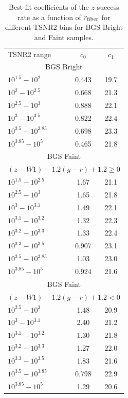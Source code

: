 \begin{table} 
    \caption{Best-fit coefficients of the $z$-success rate as a function of
    $r_{\rm fiber}$ for different TSNR2 bins for BGS Bright and Faint samples.} 
    \begin{center}
        \begin{tabular}{lcc} \toprule
            TSNR2 range & $c_0$ & $c_1$ \\[3pt]
            \multicolumn{3}{c}{BGS Bright} \\
            \hline 
            $10^{1.5}   - 10^{2}$       & 0.443 & 19.7 \\ 
            $10^{2}     - 10^{2.5}$       & 0.668 & 21.3 \\ 
            $10^{2.5}   - 10^{3}$       & 0.888 & 22.1 \\ 
            $10^{3}     - 10^{3.5}$       & 0.822 & 22.4 \\ 
            $10^{3.5}   - 10^{3.85}$    & 0.698 & 23.3 \\ 
            $10^{3.85}  - 10^{5}$      & 0.465 & 21.8 \\ 
            \hline            
            \hline 
            \multicolumn{3}{c}{BGS Faint}\\
            \multicolumn{3}{c}{$(z - W1) - 1.2(g - r) + 1.2 \ge 0$} \\
            \hline 
            $10^{1.5}   - 10^{2.5}$     & 1.67  & 21.1 \\ 
            $10^{2.5}   - 10^{3}$       & 1.65  & 21.8 \\ 
            $10^{3}     - 10^{3.1}$     & 1.49  & 22.1 \\ 
            $10^{3.1}   - 10^{3.2}$     & 1.32  & 22.3 \\ 
            $10^{3.2}   - 10^{3.3}$     & 1.33  & 22.4 \\ 
            $10^{3.3}   - 10^{3.5}$     & 0.907 & 23.1 \\ 
            $10^{3.5}   - 10^{3.85}$    & 1.03  & 23.0 \\ 
            $10^{3.85}  - 10^{5}$       & 0.924 & 21.6 \\ 
            \hline 
            \hline 
            \multicolumn{3}{c}{BGS Faint}\\
            \multicolumn{3}{c}{$(z - W1) - 1.2(g - r) + 1.2 < 0$} \\
            \hline 
            $10^{2.5}   - 10^{3}$       & 1.48  & 20.9 \\ 
            $10^{3}     - 10^{3.1}$     & 2.40  & 21.2 \\ 
            $10^{3.1}   - 10^{3.2}$     & 1.30  & 21.8 \\ 
            $10^{3.2}   - 10^{3.3}$     & 1.27  & 22.0 \\ 
            $10^{3.3}   - 10^{3.5}$     & 1.83  & 21.6 \\ 
            $10^{3.5}   - 10^{3.85}$    & 0.798 & 22.9 \\ 
            $10^{3.85}  - 10^{5}$       & 1.29  & 20.6 \\ 
            \hline 
        \end{tabular} \label{tab:zfail}
    \end{center}
\end{table}
